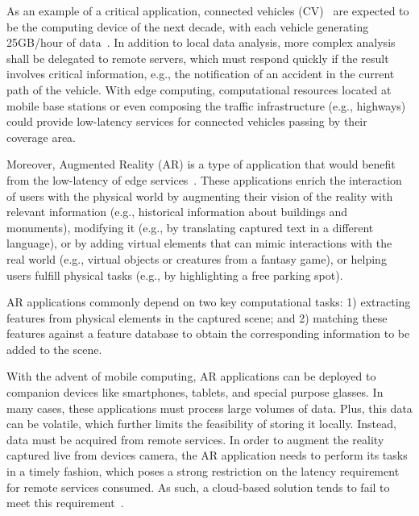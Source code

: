 As an example of a critical application, connected vehicles (CV)~\cite{Bonomi:2012} are expected to be the computing device of the next decade, with each vehicle generating 25GB/hour of data~\cite{HitachiInternetOnWheels16}. In addition to local data analysis, more complex analysis shall be delegated to remote servers, which must respond quickly if the result involves critical information, e.g., the notification of an accident in the current path of the vehicle. With edge computing, computational resources located at mobile base stations or even composing the traffic infrastructure (e.g., highways) could provide low-latency services for connected vehicles passing by their coverage area.

Moreover, Augmented Reality (AR) is a type of application that would benefit from the low-latency of edge services~\cite{hu2015mobile,GarrigaMendonca2017}. These applications enrich the interaction of users with the physical
world by augmenting their vision of the reality with relevant information (e.g., historical information about buildings and monuments), modifying it (e.g., by translating captured text in a different language), or by adding virtual elements that can mimic interactions with the real world (e.g., virtual objects or creatures
from a fantasy game), or helping users fulfill physical tasks (e.g., by highlighting a free parking spot).

AR applications commonly depend on two key computational tasks: 1) extracting features from physical elements in the captured scene; and 2) matching these features against a feature database to obtain the corresponding information to be added to the scene. 

With the advent of mobile computing, AR applications can be deployed to companion devices like smartphones, tablets, and special purpose glasses. In many cases, these applications must process large volumes of data. Plus, this data can be volatile, which further limits the feasibility of storing it locally. Instead, data must be acquired from remote services. In order to augment the reality captured live from devices camera, the AR application needs to perform its tasks in a timely fashion, which poses a strong restriction on the latency requirement for remote services consumed. As such, a cloud-based solution tends to fail to meet this requirement~\cite{GarrigaMendonca2017}. 



